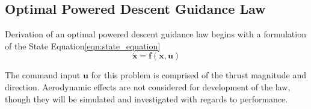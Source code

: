 %
%
%
%
%
%
%











\subsection{Optimal Powered Descent Guidance Law}
Derivation of an optimal powered descent guidance law begins with a formulation of the State Equation\:\ref{eqn:state_equation}
\begin{equation}
\dot{\boldsymbol{x}} = \boldsymbol{f}(\boldsymbol{x,\boldsymbol{u}})
\label{eqn:state_equation}
\end{equation}

The command input $\boldsymbol{u}$ for this problem is comprised of the thrust magnitude and direction. Aerodynamic effects are not considered for development of the law, though they will be simulated and investigated with regards to performance.


